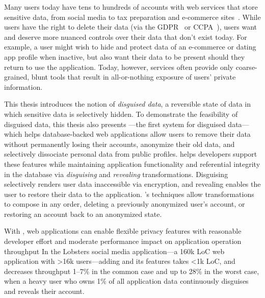 Many users today have tens to hundreds of accounts with web services that store
sensitive data, from social media to tax preparation and e-commerce
sites~\cite{tens,hundreds,password_life_cycle}.
%
While users have the right to delete their data (via \eg the
GDPR~\cite{eu:gdpr} or CCPA~\cite{ccpa}), users want and deserve more nuanced
controls over their data that don't exist today.
%
For example, a user might wish to hide
and protect data of an e-commerce or dating app profile when inactive, but also
want their data to be present should they return to use the application. 
%
Today, however, services often provide only coarse-grained, blunt tools that
result in all-or-nothing exposure of users’ private information.
%

%
This thesis introduces the notion of \emph{disguised data}, a reversible state
of data in which sensitive data is selectively hidden.
%
To demonstrate the feasibility of disguised data, this thesis also presents
\sys---the first system for disguised data---which helps database-backed web applications allow users
to remove their data without permanently losing their accounts, anonymize their
old data, and selectively dissociate personal data from public profiles.
%
\sys helps developers support these features while maintaining application
functionality and referential integrity in the database via \emph{disguising} and
\emph{revealing} transformations.
%
Disguising selectively renders user data inaccessible via encryption, and
revealing enables the user to restore their data to the application.
%
\sys's techniques allow transformations to compose in any order, \eg deleting a
previously anonymized user's account, or restoring an account back to an
anonymized state.
%

%
With \sys, web applications can enable flexible privacy features with reasonable
developer effort 
and moderate performance impact on
application operation throughput 
%
In the Lobsters social media application---a 160k LoC web application with >16k
users---adding \sys and its features takes <1k LoC, and decreases throughput
1--7\% in the common case and up to 28\% in the worst case, when a heavy user
who owns 1\% of all application data continuously disguises and reveals their
account.
%

%
